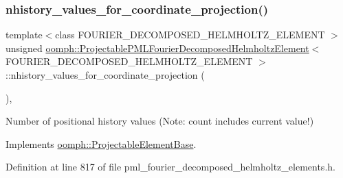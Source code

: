 \subsubsection{\texorpdfstring{nhistory\+\_\+values\+\_\+for\+\_\+coordinate\+\_\+projection()}{nhistory\_values\_for\_coordinate\_projection()}}
{\footnotesize\ttfamily template$<$class F\+O\+U\+R\+I\+E\+R\+\_\+\+D\+E\+C\+O\+M\+P\+O\+S\+E\+D\+\_\+\+H\+E\+L\+M\+H\+O\+L\+T\+Z\+\_\+\+E\+L\+E\+M\+E\+NT $>$ \\
unsigned \hyperlink{classoomph_1_1ProjectablePMLFourierDecomposedHelmholtzElement}{oomph\+::\+Projectable\+P\+M\+L\+Fourier\+Decomposed\+Helmholtz\+Element}$<$ F\+O\+U\+R\+I\+E\+R\+\_\+\+D\+E\+C\+O\+M\+P\+O\+S\+E\+D\+\_\+\+H\+E\+L\+M\+H\+O\+L\+T\+Z\+\_\+\+E\+L\+E\+M\+E\+NT $>$\+::nhistory\+\_\+values\+\_\+for\+\_\+coordinate\+\_\+projection (\begin{DoxyParamCaption}{ }\end{DoxyParamCaption})\hspace{0.3cm}{\ttfamily [inline]}, {\ttfamily [virtual]}}



Number of positional history values (Note\+: count includes current value!) 



Implements \hyperlink{classoomph_1_1ProjectableElementBase_ab4ecd0cd24000a3ed675dc7198203c1f}{oomph\+::\+Projectable\+Element\+Base}.



Definition at line 817 of file pml\+\_\+fourier\+\_\+decomposed\+\_\+helmholtz\+\_\+elements.\+h.

\mbox{\label{classoomph_1_1ProjectablePMLFourierDecomposedHelmholtzElement_a0ff6495f24663e6f1c8a50fa75443915}} 
